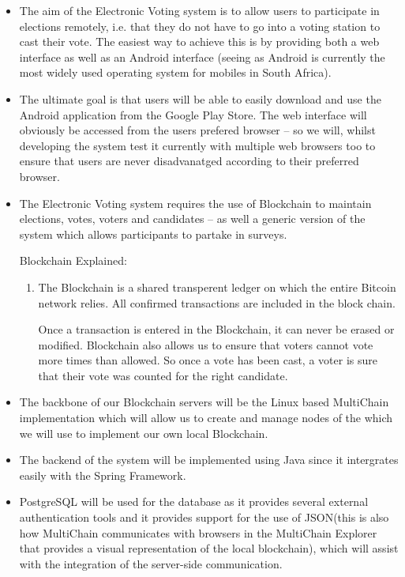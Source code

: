 \begin{itemize}
		\item The aim of the Electronic Voting system is to allow users to participate in elections remotely, i.e. that they do not have to go into a voting station to cast their vote. The easiest way to achieve this is by providing both a web interface as well as an Android interface (seeing as Android is currently the most widely used operating system for mobiles in South Africa). 
		
		\item The ultimate goal is that users will be able to easily download and use the Android application from the Google Play Store. The web interface will obviously be accessed from the users prefered browser – so we will, whilst developing the system test it currently with multiple web browsers too to ensure that users are never disadvanatged according to their preferred browser.  
		
		\item The Electronic Voting system requires the use of Blockchain to maintain elections, votes, voters and candidates – as well a generic version of the system which allows participants to partake in surveys. 
		
		Blockchain Explained: 
		\begin{enumerate}
			\item[] The Blockchain is a shared transperent ledger on which the entire Bitcoin network relies. All confirmed transactions are included in the block chain. 
			
			Once a transaction is entered in the Blockchain, it can never be erased or modified. Blockchain also allows us to ensure that voters cannot vote more times than allowed. So once a vote has been cast, a voter is sure that their vote was counted for the right candidate. 
		\end{enumerate}
		
		\item The backbone of our Blockchain servers will be the Linux based MultiChain implementation which will allow us to create and manage nodes of the which we will use to implement our own local Blockchain. 
		
		\item The backend of the system will be implemented using Java since it intergrates easily with the Spring Framework.   			
		
		\item PostgreSQL will be used for the database as it provides several external authentication tools and it provides support for the use of JSON(this is also how MultiChain communicates with browsers in the MultiChain Explorer that provides a visual representation of the local blockchain), which will assist with the integration of the server-side communication. 
		

\end{itemize}
